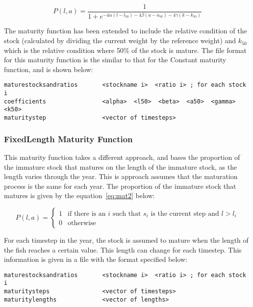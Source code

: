 \documentclass [a4paper, 10pt]{book}
\begin{document}
\begin{equation}\label{eq:mat4}
P(l, a) = \frac{1}{ 1 + e^{-4\alpha(l - l_{50}) -4\beta(a - a_{50}) -4\gamma(k - k_{50})}}
\end{equation}

The maturity function has been extended to include the relative condition of the stock (calculated by dividing the current weight by the reference weight) and $k_50$ which is the relative condition where 50\% of the stock is mature.  The file format for this maturity function is the similar to that for the Constant maturity function, and is shown below:

{\small\begin{verbatim}
maturestocksandratios       <stockname i>  <ratio i> ; for each stock i
coefficients                <alpha>  <l50>  <beta>  <a50>  <gamma>  <k50>
maturitystep                <vector of timesteps>
\end{verbatim}}

\subsubsection{FixedLength Maturity Function}
This maturity function takes a different approach, and bases the proportion of the immature stock that matures on the length of the immature stock, as the length varies through the year.  This is approach assumes that the maturation process is the same for each year.  The proportion of the immature stock that matures is given by the equation~\ref{eq:mat2} below:

\begin{equation}\label{eq:mat2}
P(l, a) =
\begin{cases}
1 & \textrm{if there is an $i$ such that $s_i$ is the current step and $l > l_i$}\\
0 & \textrm{otherwise}
\end{cases}
\end{equation}

For each timestep in the year, the stock is assumed to mature when the length of the fish reaches a certain value.  This length can change for each timestep.  This information is given in a file with the format specified below:

{\small\begin{verbatim}
maturestocksandratios       <stockname i>  <ratio i> ; for each stock i
maturitysteps               <vector of timesteps>
maturitylengths             <vector of lengths>
\end{verbatim}}
\end{document}
